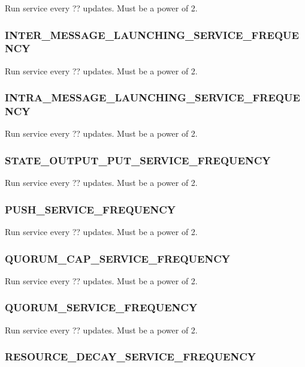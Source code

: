 Run service every ?? updates.
Must be a power of 2.

\subsubsection{INTER\_MESSAGE\_LAUNCHING\_SERVICE\_FREQUENCY}


Run service every ?? updates.
Must be a power of 2.

\subsubsection{INTRA\_MESSAGE\_LAUNCHING\_SERVICE\_FREQUENCY}


Run service every ?? updates.
Must be a power of 2.

\subsubsection{STATE\_OUTPUT\_PUT\_SERVICE\_FREQUENCY}


Run service every ?? updates.
Must be a power of 2.

\subsubsection{PUSH\_SERVICE\_FREQUENCY}


Run service every ?? updates.
Must be a power of 2.

\subsubsection{QUORUM\_CAP\_SERVICE\_FREQUENCY}


Run service every ?? updates.
Must be a power of 2.

\subsubsection{QUORUM\_SERVICE\_FREQUENCY}


Run service every ?? updates.
Must be a power of 2.

\subsubsection{RESOURCE\_DECAY\_SERVICE\_FREQUENCY}

